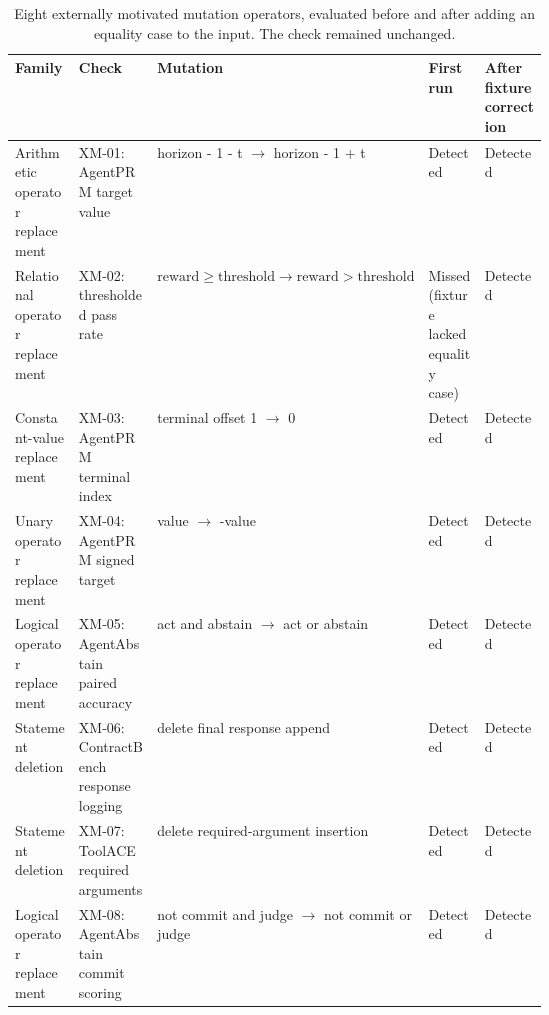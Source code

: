 \begin{table}[t]
\centering
\footnotesize
\setlength{\tabcolsep}{2.5pt}
\renewcommand{\arraystretch}{1.08}
\caption{Eight externally motivated mutation operators, evaluated before and after adding an equality case to the input. The check remained unchanged.}
\label{tab:external-mutation-operators-v1}
\begin{tabularx}{\linewidth}{@{}>{\raggedright\arraybackslash}p{0.15\linewidth}>{\raggedright\arraybackslash}p{0.19\linewidth}>{\raggedright\arraybackslash}X>{\raggedright\arraybackslash}p{0.13\linewidth}>{\raggedright\arraybackslash}p{0.15\linewidth}@{}}
\toprule
Family & Check & Mutation & First run & After fixture correction \\
\midrule
Arithmetic operator replacement & XM-01: AgentPRM target value & horizon - 1 - t $\rightarrow$ horizon - 1 + t & Detected & Detected \\
Relational operator replacement & XM-02: thresholded pass rate & $\mathrm{reward} \geq \mathrm{threshold} \rightarrow \mathrm{reward} > \mathrm{threshold}$ & Missed (fixture lacked equality case) & Detected \\
Constant-value replacement & XM-03: AgentPRM terminal index & terminal offset 1 $\rightarrow$ 0 & Detected & Detected \\
Unary operator replacement & XM-04: AgentPRM signed target & value $\rightarrow$ -value & Detected & Detected \\
Logical operator replacement & XM-05: AgentAbstain paired accuracy & act and abstain $\rightarrow$ act or abstain & Detected & Detected \\
Statement deletion & XM-06: ContractBench response logging & delete final response append & Detected & Detected \\
Statement deletion & XM-07: ToolACE required arguments & delete required-argument insertion & Detected & Detected \\
Logical operator replacement & XM-08: AgentAbstain commit scoring & not commit and judge $\rightarrow$ not commit or judge & Detected & Detected \\
\bottomrule
\end{tabularx}
\end{table}
